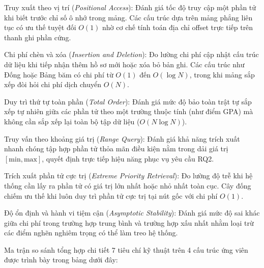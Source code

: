 \documentclass[14pt,a4paper]{extarticle}
\begin{document}
Truy xuất theo vị trí (\textit{Positional Access}): Đánh giá tốc độ truy cập một phần tử khi biết trước chỉ số ô nhớ trong mảng. Các cấu trúc dựa trên mảng phẳng liên tục có ưu thế tuyệt đối $O(1)$ nhờ cơ chế tính toán địa chỉ offset trực tiếp trên thanh ghi phần cứng.

Chi phí chèn và xóa (\textit{Insertion and Deletion}): Đo lường chi phí cập nhật cấu trúc dữ liệu khi tiếp nhận thêm hồ sơ mới hoặc xóa bỏ bản ghi. Các cấu trúc như Đống hoặc Bảng băm có chi phí từ $O(1)$ đến $O(\log N)$, trong khi mảng sắp xếp đòi hỏi chi phí dịch chuyển $O(N)$.

Duy trì thứ tự toàn phần (\textit{Total Order}): Đánh giá mức độ bảo toàn trật tự sắp xếp tự nhiên giữa các phần tử theo một trường thuộc tính (như điểm GPA) mà không cần sắp xếp lại toàn bộ tập dữ liệu ($O(N \log N)$).

Truy vấn theo khoảng giá trị (\textit{Range Query}): Đánh giá khả năng trích xuất nhanh chóng tập hợp phần tử thỏa mãn điều kiện nằm trong dải giá trị $[\text{min}, \text{max}]$, quyết định trực tiếp hiệu năng phục vụ yêu cầu RQ2.

Trích xuất phần tử cực trị (\textit{Extreme Priority Retrieval}): Đo lường độ trễ khi hệ thống cần lấy ra phần tử có giá trị lớn nhất hoặc nhỏ nhất toàn cục. Cây đống chiếm ưu thế khi luôn duy trì phần tử cực trị tại nút gốc với chi phí $O(1)$.

Độ ổn định và hành vi tiệm cận (\textit{Asymptotic Stability}): Đánh giá mức độ sai khác giữa chi phí trong trường hợp trung bình và trường hợp xấu nhất nhằm loại trừ các điểm nghẽn nghiêm trọng có thể làm treo hệ thống.

Ma trận so sánh tổng hợp chi tiết 7 tiêu chí kỹ thuật trên 4 cấu trúc ứng viên được trình bày trong bảng dưới đây:
\end{document}
